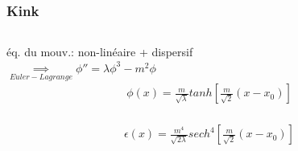 \documentclass[handout]{beamer}
\begin{document}
%

\begin{frame}\frametitle{Kink}
\begin{columns}[T]

 \begin{column}[T]{.6\linewidth}
 \begin{block}{}
 éq. du mouv.: non-linéaire + dispersif\\
  $\underset{Euler-Lagrange}{\implies} \phi'' = \lambda \phi^3 - m^2 \phi$
\begin{align*}
\phi(x) = \frac{m}{\sqrt{\lambda}}tanh\left[\frac{m}{\sqrt{2}}(x-x_0)\right] \\
\end{align*}
 \end{block}
 
 \begin{exampleblock}{}
   
\begin{align*}
\epsilon(x)= \frac{m^4}{\sqrt{2\lambda}}sech^4\left[\frac{m}{\sqrt{2}}(x-x_0)\right]
\end{align*}
 \end{exampleblock}


\end{column}
\end{columns}
\end{frame}
\end{document}
